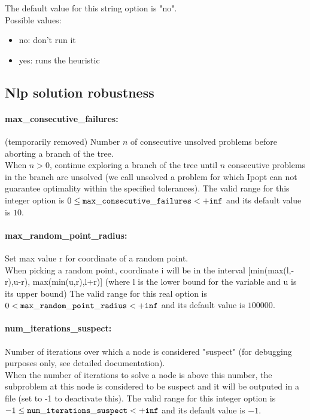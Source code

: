 The default value for this string option is "no".
\\ 
Possible values:
\begin{itemize}
   \item no: don't run it
   \item yes: runs the heuristic
\end{itemize}

\subsection{Nlp solution robustness}
\label{sec:Nlp_solution_robustness}
\paragraph{\bf max\_consecutive\_failures:}\label{sec:max_consecutive_failures} (temporarily removed) Number $n$ of consecutive unsolved problems before aborting a branch of the tree. $\;$ \\
 When $n > 0$, continue exploring a branch of the
tree until $n$ consecutive problems in the branch
are unsolved (we call unsolved a problem for
which Ipopt can not guarantee optimality within
the specified tolerances). The valid range for this integer option is
$0 \le {\tt max\_consecutive\_failures } <  {\tt +inf}$
and its default value is $10$.


\paragraph{\bf max\_random\_point\_radius:}\label{sec:max_random_point_radius} Set max value r for coordinate of a random point. $\;$ \\
 When picking a random point, coordinate i will be
in the interval [min(max(l,-r),u-r),
max(min(u,r),l+r)] (where l is the lower bound
for the variable and u is its upper bound) The valid range for this real option is 
$0 <  {\tt max\_random\_point\_radius } <  {\tt +inf}$
and its default value is $100000$.


\paragraph{\bf num\_iterations\_suspect:}\label{sec:num_iterations_suspect} Number of iterations over which a node is considered "suspect" (for debugging purposes only, see detailed documentation). $\;$ \\
 When the number of iterations to solve a node is
above this number, the subproblem at this node is
considered to be suspect and it will be outputed
in a file (set to -1 to deactivate this). The valid range for this integer option is
$-1 \le {\tt num\_iterations\_suspect } <  {\tt +inf}$
and its default value is $-1$.


